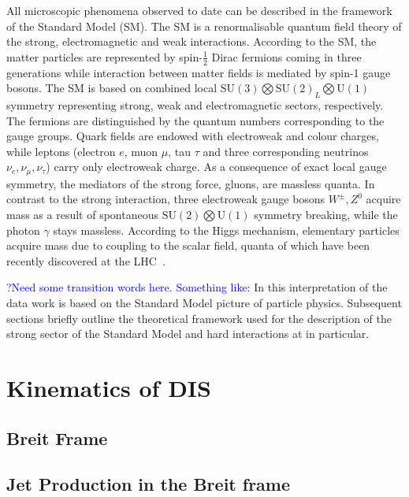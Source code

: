 All microscopic phenomena observed to date can be described in the framework of the Standard Model (SM). The SM is a renormalisable quantum field theory of the strong, electromagnetic and weak interactions. According to the SM, the matter particles are represented by spin-$\frac{1}{2}$ Dirac fermions coming in three generations while interaction between matter fields is mediated by spin-1 gauge bosons. The SM is based on combined local $\mathrm{SU}\left(3\right) \bigotimes \mathrm{SU}\left(2\right)_{L} \bigotimes \mathrm{U}\left(1\right)$ symmetry representing strong, weak and electromagnetic sectors, respectively. The fermions are distinguished by the quantum numbers corresponding to the gauge groups. Quark fields are endowed with electroweak and colour charges, while leptons (electron $e$, muon $\mu$, tau $\tau$ and three corresponding neutrinos $\nu_e, \nu_\mu, \nu_\tau$) carry only electroweak charge. As a consequence of exact local gauge symmetry, the mediators of the strong force, gluons, are massless quanta. In contrast to the strong interaction, three electroweak gauge bosons $W^\pm, Z^0$ acquire mass as a result of spontaneous $\mathrm{SU}\left(2\right) \bigotimes \mathrm{U}\left(1\right)$ symmetry breaking, while the photon $\gamma$ stays massless. According to the Higgs mechanism, elementary particles acquire mass due to coupling to the scalar field, quanta of which have been recently discovered at the LHC~\cite{pl:b716:1,pl:b716:30}.

\textcolor{blue}{?Need some transition words here. Something like:} In this interpretation of the data work is based on the Standard Model picture of particle physics. Subsequent sections briefly outline the theoretical framework used for the description of the strong sector of the Standard Model and hard interactions at \hera in particular.

\section{Kinematics of DIS}
\label{sec:kindis}


\subsection{Breit Frame}
\label{subsec:breitframe}


\subsection{Jet Production in the Breit frame}
\label{subsec:jetsinbreit}


